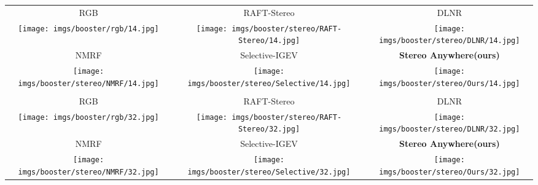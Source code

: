 \documentclass[10pt,twocolumn,letterpaper]{article}
\newcommand{\method}[0]{Stereo Anywhere\xspace}
\begin{document}
\begin{figure*}[t]
    \centering
    \renewcommand{\tabcolsep}{1pt}
    \begin{tabular}{ccc}
        \small RGB &
        \small RAFT-Stereo \cite{lipson2021raft} &
        \small DLNR \cite{zhao2023high} \\
        \texttt{[image: imgs/booster/rgb/14.jpg]} &
        \texttt{[image: imgs/booster/stereo/RAFT-Stereo/14.jpg]} &
        \texttt{[image: imgs/booster/stereo/DLNR/14.jpg]} \\
        \small NMRF \cite{guan2024neural} &
        \small Selective-IGEV \cite{wang2024selective} &
        \textbf{\method (ours)} \\
        \texttt{[image: imgs/booster/stereo/NMRF/14.jpg]} &
        \texttt{[image: imgs/booster/stereo/Selective/14.jpg]} &
        \texttt{[image: imgs/booster/stereo/Ours/14.jpg]} \\ \\
        \small RGB &
        \small RAFT-Stereo \cite{lipson2021raft} &
        \small DLNR \cite{zhao2023high} \\
        \texttt{[image: imgs/booster/rgb/32.jpg]} &
        \texttt{[image: imgs/booster/stereo/RAFT-Stereo/32.jpg]} &
        \texttt{[image: imgs/booster/stereo/DLNR/32.jpg]} \\
        \small NMRF \cite{guan2024neural} &
        \small Selective-IGEV \cite{wang2024selective} &
        \textbf{\method (ours)} \\
        \texttt{[image: imgs/booster/stereo/NMRF/32.jpg]} &
        \texttt{[image: imgs/booster/stereo/Selective/32.jpg]} &
        \texttt{[image: imgs/booster/stereo/Ours/32.jpg]} \\
    \end{tabular}

    \caption{\textbf{Qualitative Results -- Booster (part 2).} Predictions by state-of-the-art models and \method.}
    \label{fig:qual_booster_2}\vspace{-0.3cm}

\end{figure*}
\end{document}
